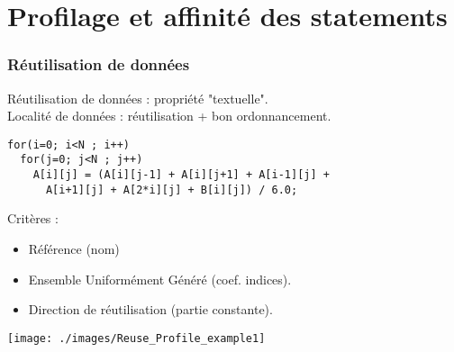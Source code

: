 \documentclass[5pt, compress]{beamer}
\begin{document}


    \section{Profilage et affinité des statements}
    \begin{frame}[fragile]
    \small
        \frametitle{Réutilisation de données}
\vspace{-0.2em}
        Réutilisation de données : propriété "textuelle".\\
        Localité de données : réutilisation + bon ordonnancement.
\pause
\vspace{-0.2em}
\begin{tcolorbox}
\begin{verbatim}
for(i=0; i<N ; i++)
  for(j=0; j<N ; j++)
    A[i][j] = (A[i][j-1] + A[i][j+1] + A[i-1][j] +
      A[i+1][j] + A[2*i][j] + B[i][j]) / 6.0;
\end{verbatim}
\end{tcolorbox}
\pause
\vspace{-0.3em}
\begin{minipage}{0.38\linewidth}
    Critères :
    \begin{itemize}\itemsep0.1em
        \item Référence (nom)
        \item Ensemble Uniformément Généré (coef. indices).
        \item Direction de réutilisation (partie constante).
    \end{itemize}
\end{minipage} \hfill
\begin{minipage}{0.59\linewidth}
\center
\texttt{[image: ./images/Reuse\_Profile\_example1]}
\end{minipage}
\end{frame}
\end{document}
